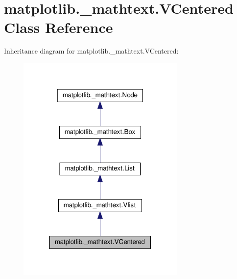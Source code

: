 \hypertarget{classmatplotlib_1_1__mathtext_1_1VCentered}{}\section{matplotlib.\+\_\+mathtext.\+V\+Centered Class Reference}
\label{classmatplotlib_1_1__mathtext_1_1VCentered}


Inheritance diagram for matplotlib.\+\_\+mathtext.\+V\+Centered\+:
\nopagebreak
\begin{figure}[H]
\begin{center}
\leavevmode
\includegraphics[width=235pt]{classmatplotlib_1_1__mathtext_1_1VCentered__inherit__graph}
\end{center}
\end{figure}


